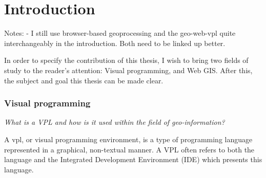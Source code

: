 \chapter{Introduction}

\begin{note}
Notes: 
- I still use browser-based geoprocessing and the geo-web-vpl quite interchangeably in the introduction. Both need to be linked up better.

\end{note}



In order to specify the contribution of this thesis, I wish to bring two fields of study to the reader's attention: Visual programming, and Web GIS. 
After this, the subject and goal this thesis can be made clear.

\subsection*{Visual programming}

\emph{What is a VPL and how is it used within the field of geo-information?}

A \ac{vpl}, or visual programming environment, is a type of programming language represented in a graphical, non-textual manner.
A VPL often refers to both the language and the Integrated Development Environment (IDE) which presents this language.



